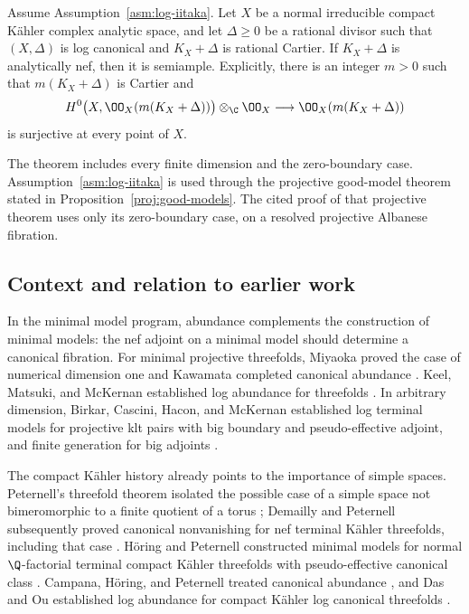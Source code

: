 \begin{theorem}\label{thm:main}
Assume Assumption~\ref{asm:log-iitaka}. Let \(X\) be a normal irreducible
compact Kähler complex analytic space, and let \(\Delta\geq0\) be a rational
divisor such that \((X,\Delta)\) is log canonical and \(K_X+\Delta\) is
rational Cartier. If \(K_X+\Delta\) is analytically nef, then it is
semiample. Explicitly, there is an integer \(m>0\) such that
\(m(K_X+\Delta)\) is Cartier and
\[
 H^0\bigl(X,\OO_X(m(K_X+\Delta))\bigr)\otimes_{\C}\OO_X
 \longrightarrow \OO_X(m(K_X+\Delta))
\]
is surjective at every point of \(X\).
\end{theorem}

The theorem includes every finite dimension and the zero-boundary case.
Assumption~\ref{asm:log-iitaka} is used through the projective good-model
theorem stated in Proposition~\ref{proj:good-models}. The cited proof of
that projective theorem uses only its zero-boundary case, on a resolved
projective Albanese fibration.

\subsection{Context and relation to earlier work}

In the minimal model program, abundance complements the construction of
minimal models: the nef adjoint on a minimal model should determine a
canonical fibration. For minimal projective threefolds, Miyaoka proved the
case of numerical dimension one and Kawamata completed canonical abundance
\cite{Miyaoka1988,Kawamata1992}. Keel, Matsuki, and McKernan established
log abundance for threefolds
\cite{KMM1994,KMM2004}. In arbitrary dimension, Birkar, Cascini, Hacon, and
McKernan established log terminal models for projective klt pairs with big
boundary and pseudo-effective adjoint, and finite generation for big
adjoints \cite{BCHM2010}.

The compact Kähler history already points to the importance of simple
spaces. Peternell's threefold theorem isolated the possible case of a simple
space not bimeromorphic to a finite quotient of a torus
\cite{Peternell2001}; Demailly and Peternell subsequently proved canonical
nonvanishing for nef terminal Kähler threefolds, including that case
\cite{DemaillyPeternell2003}. Höring and Peternell constructed minimal models
for normal \(\Q\)-factorial terminal compact Kähler threefolds with pseudo-effective canonical class
\cite{HoeringPeternell2016}. Campana, Höring, and Peternell treated canonical abundance
\cite{CHP2016,CHP2023}, and Das and Ou
established log abundance for compact Kähler log canonical threefolds
\cite[Corollary~1.3]{DasOu2026}.


